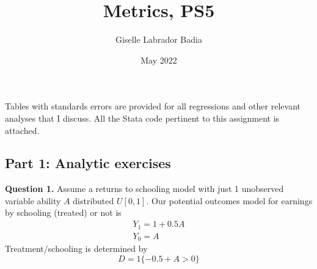\documentclass{article}
\title{Metrics, PS5}
\author{Giselle Labrador Badia}
\date{May 2022}
\theoremstyle{definition}
\begin{document}
\maketitle

 Tables with standards errors are provided for all regressions and other relevant analyses that I discuss. All the Stata code pertinent to this assignment is attached. 
 
 \subsection*{Part 1: Analytic exercises}
 
 \noindent \hspace{0.41cm} \textbf{Question 1.}  Assume a returns to schooling model with just 1 unobserved variable ability $A$ distributed $U[0,1]$. Our potential outcomes model for earnings by schooling (treated) or not is
$$
\begin{gathered}
Y_{1}=1+0.5 A \\
Y_{0}=A
\end{gathered}
$$
Treatment/schooling is determined by
$$
D=1\{-0.5+A>0\}
$$
 
\end{document}
